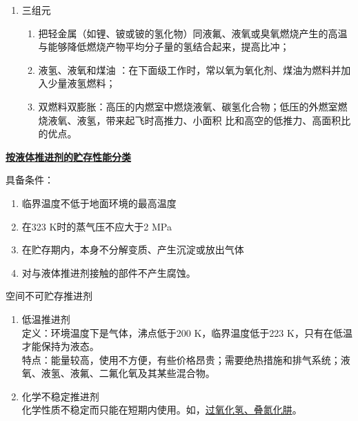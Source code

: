 \begin{enumerate}[\hspace*{1.5em} (1)  ]
	\item 三组元\vspace*{-0.8em}
	\begin{enumerate}
		\item 把轻金属（如锂、铍或铍的氢化物）同液氟、液氧或臭氧燃烧产生的高温与能够降低燃烧产物平均分子量的氢结合起来，提高比冲；\vspace*{-0.5em}
		\item 液氢、液氧和煤油 ：在下面级工作时，常以氧为氧化剂、煤油为燃料并加入少量液氢燃料；\vspace*{-0.5em}
		\item 双燃料双膨胀：高压的内燃室中燃烧液氧、碳氢化合物；低压的外燃室燃烧液氧、液氢，带来起飞时高推力、小面积 比和高空的低推力、高面积比的优点。
	\end{enumerate}
\end{enumerate}

\noindent \textbf{\underline{按液体推进剂的贮存性能分类}}

\noindent 具备条件：
\begin{enumerate}[\hspace*{1.5em}(1)  ]
	\item 临界温度不低于地面环境的最高温度\vspace*{-0.5em}
	\item 在323 K时的蒸气压不应大于2 MPa\vspace*{-0.5em}
	\item 在贮存期内，本身不分解变质、产生沉淀或放出气体\vspace*{-0.5em}
	\item 对与液体推进剂接触的部件不产生腐蚀。
\end{enumerate}


\noindent 空间不可贮存推进剂
\vspace*{-0.8em}
\begin{enumerate}[\hspace*{1.5em} (1) ]
	\item 低温推进剂\\
	定义：环境温度下是气体，沸点低于200 K，临界温度低于223 K，只有在低温才能保持为液态。\\
	特点：能量较高，使用不方便，有些价格昂贵；需要绝热措施和排气系统；液氧、液氢、液氟、二氟化氧及其某些混合物。\vspace*{-0.5em}
	
	\item 化学不稳定推进剂\\
	化学性质不稳定而只能在短期内使用。如，\underline{过氧化氢、叠氮化肼}。
\end{enumerate}

